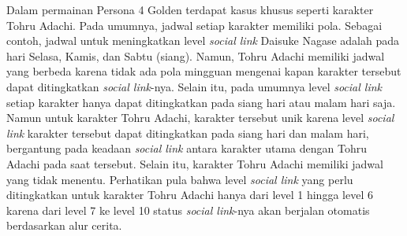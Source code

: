 Dalam permainan Persona 4 Golden terdapat kasus khusus seperti karakter Tohru Adachi. Pada umumnya, jadwal setiap karakter memiliki pola. Sebagai contoh, jadwal untuk meningkatkan level \textit{social link} Daisuke Nagase adalah pada hari Selasa, Kamis, dan Sabtu (siang). Namun, Tohru Adachi memiliki jadwal yang berbeda karena tidak ada pola mingguan mengenai kapan karakter tersebut dapat ditingkatkan \textit{social link}-nya. Selain itu, pada umumnya level \textit{social link} setiap karakter hanya dapat ditingkatkan pada siang hari atau malam hari saja. Namun untuk karakter Tohru Adachi, karakter tersebut unik karena level \textit{social link} karakter tersebut dapat ditingkatkan pada siang hari dan malam hari, bergantung pada keadaan \textit{social link} antara karakter utama dengan Tohru Adachi pada saat tersebut. Selain itu, karakter Tohru Adachi memiliki jadwal yang tidak menentu. Perhatikan pula bahwa level \textit{social link} yang perlu ditingkatkan untuk karakter Tohru Adachi hanya dari level 1 hingga level 6 karena dari level 7 ke level 10 status \textit{social link}-nya akan berjalan otomatis berdasarkan alur cerita.